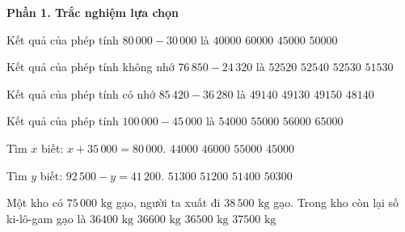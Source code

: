 \textbf{Phần 1. Trắc nghiệm lựa chọn}

\begin{ex} %
Kết quả của phép tính $80\,000 - 30\,000$ là
\choice
{$40000$}
{$60000$}
{$45000$}
{\True $50000$}
\end{ex}

\begin{ex} %
Kết quả của phép tính không nhớ $76\,850 - 24\,320$ là
\choice
{$52520$}
{$52540$}
{\True $52530$}
{$51530$}
\end{ex}

\begin{ex} %
Kết quả của phép tính có nhớ $85\,420 - 36\,280$ là
\choice
{\True $49140$}
{$49130$}
{$49150$}
{$48140$}
\end{ex}

\begin{ex} %
Kết quả của phép tính $100\,000 - 45\,000$ là
\choice
{$54000$}
{\True $55000$}
{$56000$}
{$65000$}
\end{ex}

\begin{ex} %
Tìm $x$ biết: $x + 35\,000 = 80\,000$.
\choice
{$44000$}
{$46000$}
{$55000$}
{\True $45000$}
\end{ex}

\begin{ex} %
Tìm $y$ biết: $92\,500 - y = 41\,200$.
\choice
{\True $51300$}
{$51200$}
{$51400$}
{$50300$}
\end{ex}

\begin{ex} %
Một kho có $75\,000\text{ kg}$ gạo, người ta xuất đi $38\,500\text{ kg}$ gạo. Trong kho còn lại số ki-lô-gam gạo là
\choice
{$36400\text{ kg}$}
{$36600\text{ kg}$}
{\True $36500\text{ kg}$}
{$37500\text{ kg}$}
\end{ex}

